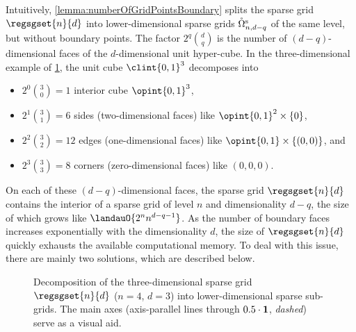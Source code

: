 Intuitively, \cref{lemma:numberOfGridPointsBoundary} splits the sparse grid
$\regsgset{n}{d}$ into lower-dimensional sparse grids
$\interiorregsgset{n}{d-q}$ of the same level, but without boundary points.
The factor $2^q \binom{d}{q}$ is the number of $(d-q)$-dimensional faces
of the $d$-dimensional unit hyper-cube.
In the three-dimensional example of \cref{fig:sgDecompose},
the unit cube $\clint{0, 1}^3$ decomposes into
\begin{itemize}
  \item
  $2^0 \binom{3}{0} = 1$ interior cube $\opint{0, 1}^3$,
  
  \item
  $2^1 \binom{3}{1} = 6$ sides (two-dimensional faces)
  like $\opint{0, 1}^2 \times \{0\}$,
  
  \item
  $2^2 \binom{3}{2} = 12$ edges (one-dimensional faces)
  like $\opint{0, 1} \times \{(0, 0)\}$, and
  
  \item
  $2^3 \binom{3}{3} = 8$ corners (zero-dimensional faces)
  like $(0, 0, 0)$.
\end{itemize}
On each of these $(d-q)$-dimensional faces,
the sparse grid $\regsgset{n}{d}$ contains
the interior of a sparse grid of level $n$ and dimensionality $d - q$,
the size of which grows like $\landauO{2^n n^{d-q-1}}$.
As the number of boundary faces increases exponentially
with the dimensionality $d$,
the size of $\regsgset{n}{d}$ quickly exhausts the available
computational memory.
To deal with this issue, there are mainly two solutions,
which are described below.

\begin{figure}
  \raisebox{-0.5\height-0.5mm}{$\;\;=\;\;$}%
  \raisebox{-0.5\height}{$\;\;\dotcup\;\;$}%
  \raisebox{-0.5\height}{$\;\;\dotcup\;\;$}%
  \raisebox{-0.5\height}{$\;\;\dotcup\;\;$}%
  \caption[%
    Decomposition of a sparse grid into lower-dimensional sparse sub-grids%
  ]{%
    Decomposition of the three-dimensional sparse grid $\regsgset{n}{d}$
    ($n = 4$, $d = 3$) into lower-dimensional sparse sub-grids.
    The main axes (axis-parallel lines through $0.5 \cdot {\boldsymbol{1}}$, \emph{dashed})
    serve as a visual aid.%
  }%
  \label{fig:sgDecompose}%
\end{figure}



